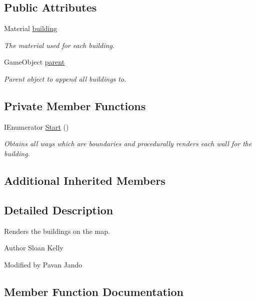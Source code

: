 \subsection*{Public Attributes}
\begin{DoxyCompactItemize}
\item 
Material \mbox{\hyperlink{class_building_maker_a1de67cfa4c1a4f25ad07d8930925bd09}{building}}
\begin{DoxyCompactList}\small\item\em The material used for each building. \end{DoxyCompactList}\item 
Game\+Object \mbox{\hyperlink{class_building_maker_a9a9535053ed24cf75681b437970e9752}{parent}}
\begin{DoxyCompactList}\small\item\em Parent object to append all buildings to. \end{DoxyCompactList}\end{DoxyCompactItemize}
\subsection*{Private Member Functions}
\begin{DoxyCompactItemize}
\item 
I\+Enumerator \mbox{\hyperlink{class_building_maker_a9985c258cbadc8d68689e951742b3e12}{Start}} ()
\begin{DoxyCompactList}\small\item\em Obtains all ways which are boundaries and procedurally renders each wall for the building. \end{DoxyCompactList}\end{DoxyCompactItemize}
\subsection*{Additional Inherited Members}


\subsection{Detailed Description}
Renders the buildings on the map. 

\begin{DoxyAuthor}{Author}
Sloan Kelly 

Modified by Pavan Jando
\end{DoxyAuthor}


\subsection{Member Function Documentation}
\mbox{\label{class_building_maker_a9985c258cbadc8d68689e951742b3e12}} 
